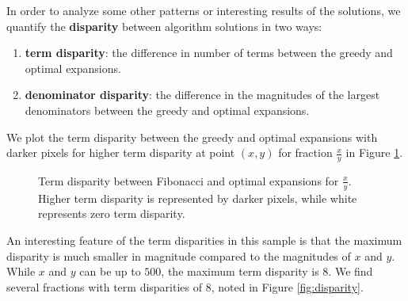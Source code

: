 \documentclass[paper=a4, fontsize=11pt]{scrartcl}
\numberwithin{equation}{section}	 %
\numberwithin{figure}{section}	 %
\numberwithin{table}{section}	 %
\begin{document}
In order to analyze some other patterns or interesting results of the solutions, we quantify the \textbf{disparity} between algorithm solutions in two ways:
\begin{enumerate}
	\item \textbf{term disparity}: the difference in number of terms between the greedy and optimal expansions.
	\item \textbf{denominator disparity}: the difference in the magnitudes of the largest denominators between the greedy and optimal expansions.
\end{enumerate}

We plot the term disparity between the greedy and optimal expansions with darker pixels for higher term disparity at point $(x,y)$ for fraction $\frac{x}{y}$ in Figure \ref{fig:term_disp}.

\begin{figure}[t]
\centering
{}
\caption{Term disparity between Fibonacci and optimal expansions for $\frac{x}{y}$. Higher term disparity is represented by darker pixels, while white represents zero term disparity.}
\label{fig:term_disp}
\end{figure}

An interesting feature of the term disparities in this sample is that the maximum disparity is much smaller in magnitude compared to the magnitudes of $x$ and $y$. While $x$ and $y$ can be up to $500$, the maximum term disparity is $8$. We find several fractions with term disparities of $8$, noted in Figure \ref{fig:disparity}.
\end{document}
